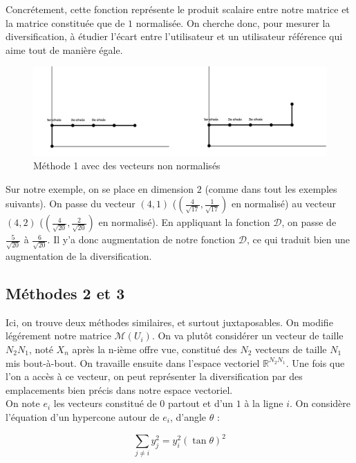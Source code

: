 \documentclass[11pt, oneside]{article}
\begin{document}
Concrétement, cette fonction représente le produit scalaire entre notre matrice et la matrice constituée que de $1$ normalisée. On cherche donc, pour mesurer la diversification, à étudier l'écart entre l'utilisateur et un utilisateur référence qui aime tout de manière égale. \\

\begin{figure}[h]
   \caption{Méthode 1 avec des vecteurs non normalisés}
   \includegraphics[width=\linewidth]{dedeuxaquatre.png}
\end{figure}

Sur notre exemple, on se place en dimension $2$ (comme dans tout les exemples suivants). On passe du vecteur $(4,1)$ ($(\frac{4}{\sqrt{17}},\frac{1}{\sqrt{17}})$ en normalisé) au vecteur $(4,2)$ ($(\frac{4}{\sqrt{20}},\frac{2}{\sqrt{20}})$ en normalisé). En appliquant la fonction $\mathcal{D}$, on passe de $\frac{5}{\sqrt{20}}$ à $\frac{6}{\sqrt{20}}$. Il y'a donc augmentation de notre fonction $\mathcal{D}$, ce qui traduit bien une augmentation de la diversification. 



\subsection{Méthodes 2 et 3}

Ici, on trouve deux méthodes similaires, et surtout juxtaposables. On modifie légérement notre matrice $\mathcal{M} (U_i)$. On va plutôt considérer un vecteur de taille $N_2 N_1$, noté $X_n$ après la n-ième offre vue, constitué des $N_2$ vecteurs de taille $N_1$ mis bout-à-bout. On travaille ensuite dans l'espace vectoriel $\mathbb{R}^{N_2 N_1}$. Une fois que l'on a accès à ce vecteur, on peut représenter la diversification par des emplacements bien précis dans notre espace vectoriel. \\
On note $e_i$ les vecteurs constitué de $0$ partout et d'un $1$ à la ligne $i$. On considère l'équation d'un hypercone autour de $e_i$, d'angle $\theta$ :

\begin{center}

\[
\displaystyle \sum _{j \neq i} y_j ^2 = y_i ^2 (\tan{\theta}) ^2
\]
\end{center}
\end{document}
